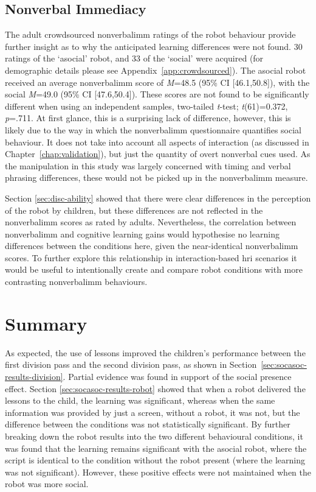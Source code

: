 \subsection{Nonverbal Immediacy}\label{sec:ch7-disc-nvi}
The adult crowdsourced \gls{nonverbalimm} ratings of the robot behaviour provide further insight as to why the anticipated \gls{learning} differences were not found. 30 ratings of the `asocial' robot, and 33 of the `social' were acquired (for demographic details please see Appendix~\ref{app:crowdsourced}). The asocial robot received an average \gls{nonverbalimm} score of \textit{M}=48.5 (95\% CI [46.1,50.8]), with the social \textit{M}=49.0 (95\% CI [47.6,50.4]). These scores are not found to be significantly different when using an independent samples, two-tailed \textit{t}-test; \textit{t}(61)=0.372, \textit{p}=.711. At first glance, this is a surprising lack of difference, however, this is likely due to the way in which the \gls{nonverbalimm} questionnaire quantifies social behaviour. It does not take into account all aspects of interaction (as discussed in Chapter~\ref{chap:validation}), but just the quantity of overt nonverbal cues used. As the manipulation in this study was largely concerned with timing and verbal phrasing differences, these would not be picked up in the \gls{nonverbalimm} measure.

Section \ref{sec:disc-ability} showed that there were clear differences in the perception of the robot by children, but these differences are not reflected in the \gls{nonverbalimm} scores as rated by adults. Nevertheless, the correlation between \gls{nonverbalimm} and cognitive \gls{learning} gains would hypothesise no \gls{learning} differences between the conditions here, given the near-identical \gls{nonverbalimm} scores. To further explore this relationship in interaction-based \acrshort{hri} scenarios it would be useful to intentionally create and compare robot conditions with more contrasting \gls{nonverbalimm} behaviours.

\section{Summary}\label{sec:social-summary}
As expected, the use of lessons improved the children's performance between the first division pass and the second division pass, as shown in Section~\ref{sec:socasoc-results-division}. Partial evidence was found in support of the social presence effect. Section \ref{sec:socasoc-results-robot} showed that when a robot delivered the lessons to the child, the \gls{learning} was significant, whereas when the same information was provided by just a screen, without a robot, it was not, but the difference between the conditions was not statistically significant. By further breaking down the robot results into the two different behavioural conditions, it was found that the \gls{learning} remains significant with the asocial robot, where the script is identical to the condition without the robot present (where the \gls{learning} was not significant). However, these positive effects were not maintained when the robot was more social.

